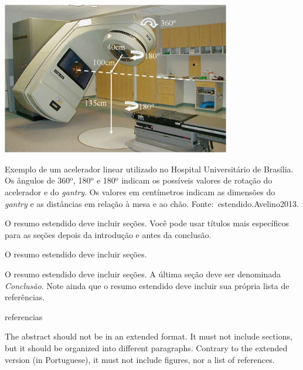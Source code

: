 \documentclass[a4paper, 12pt]{ppgeb}
\begin{document}
\begin{figureresumo}
\centering
\vspace*{18pt}
\includegraphics[width=100mm]{Acelerador2}
\caption{Exemplo de um acelerador linear utilizado no Hospital Universitário de Brasília. Os ângulos de 360${^{\textrm{o}} }$, 180${^{\textrm{o}} }$ e 180${^{\textrm{o}} }$ indicam os possíveis valores de rotação do acelerador e do \emph{gantry}. Os valores em centímetros indicam as dimensões do \emph{gantry} e as distâncias em relação à mesa e ao chão. Fonte:~\cite{resumoestendido}{estendido.Avelino2013}.}\label{fig:acelerador_resumo}
\end{figureresumo}

O resumo estendido deve incluir seções. Você pode usar títulos mais específicos para as seções depois da introdução e antes da conclusão.

O resumo estendido deve incluir seções.

O resumo estendido deve incluir seções. A última seção deve ser denominada \emph{Conclusão}. Note ainda que o resumo estendido deve incluir sua própria lista de referências.

{\let\clearpage\relax
{referencias}{}
}
\acresetall %
\clearpage
\restoregeometry
\acresetall %
\vspace{24pt}

The abstract should not be in an extended format. It must not include sections, but it should be organized into different paragraphs. Contrary to the extended version (in Portuguese), it must not include figures, nor a list of references.
\end{document}
